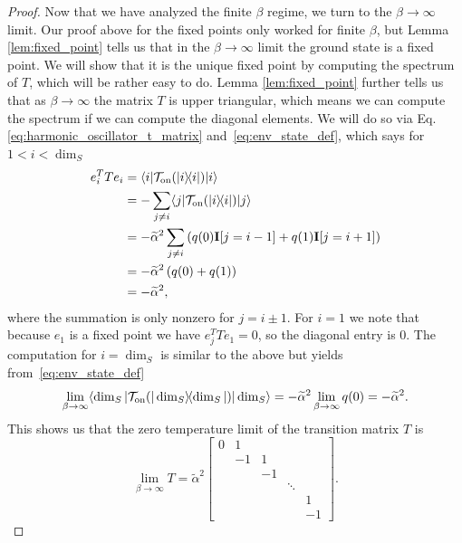 \begin{proof}
    Now that we have analyzed the finite $\beta$ regime, we turn to the $\beta \to \infty$ limit. Our proof above for the fixed points only worked for finite $\beta$, but Lemma \ref{lem:fixed_point} tells us that in the $\beta \to \infty$ limit the ground state is a fixed point. We will show that it is the unique fixed point by computing the spectrum of $T$, which will be rather easy to do. Lemma \ref{lem:fixed_point} further tells us that as $\beta \to \infty$ the matrix $T$ is upper triangular, which means we can compute the spectrum if we can compute the diagonal elements. We will do so via Eq. \eqref{eq:harmonic_oscillator_t_matrix} and~\eqref{eq:env_state_def}, which says for $1 < i < \dim_S$
    \begin{align}
        e_i^T T e_i &= \langle i| \mathcal{T}_{\rm on}(| i\rangle\! \langle i|) |i\rangle \\
        &= -\sum_{j \neq i} \langle j| \mathcal{T}_{\rm on}(| i\rangle\! \langle i|) |j\rangle \\
        &= - \widetilde{\alpha}^2 \sum_{j \neq i} \left(q(0) \mathbf{I}[j = i - 1] +  q(1) \mathbf{I}[j = i + 1] \right) \\
        &= -\widetilde{\alpha}^2 \left(q(0) + q(1) \right) \\
        &= - \widetilde{\alpha}^2,
    \end{align}
    where the summation is only nonzero for $j = i \pm 1$. For $i = 1$ we note that because $e_1$ is a fixed point we have $e_j^T T e_1 = 0$, so the diagonal entry is 0. The computation for $i = \dim_S$ is similar to the above but yields from~\eqref{eq:env_state_def}
    \begin{equation}
        \lim_{\beta \to \infty} \langle \dim_S| \mathcal{T}_{\rm on}(| \dim_S\rangle\! \langle \dim_S|) |\dim_S\rangle = -\widetilde{\alpha}^2 \lim_{\beta \to \infty}  q(0) = - \widetilde{\alpha}^2.
    \end{equation}
    This shows us that the zero temperature limit of the transition matrix $T$ is 
\begin{equation}
    \lim_{\beta \to \infty} T = \widetilde{\alpha}^2 \begin{bmatrix}
        0 & 1 &   &\\
        & -1 & 1 &  &\\
        & & -1  & & \\
        & & & \ddots & \\
        & &     &       & 1 \\
        & &  & & -1
    \end{bmatrix}.
\end{equation}

\end{proof}
